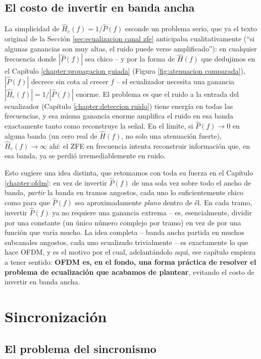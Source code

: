 \subsection*{El costo de invertir en banda ancha}

La simplicidad de $\hat H_e(f)=1/\hat P(f)$ esconde un problema serio, que ya el texto original de la Sección \ref{sec:ecualizacion canal zfe} anticipaba cualitativamente (``si algunas ganancias son muy altas, el ruido puede verse amplificado''): en cualquier frecuencia donde $|\hat P(f)|$ sea chico -- y por la forma de $\hat H(f)$ que dedujimos en el Capítulo \ref{chapter:propagacion guiada} (Figura \ref{fig:atenuacion comparada}), $|\hat P(f)|$ decrece sin cota al crecer $f$ -- el ecualizador necesita una ganancia $|\hat H_e(f)|=1/|\hat P(f)|$ enorme. El problema es que el ruido a la entrada del ecualizador (Capítulo \ref{chapter:deteccion ruido}) tiene energía en todas las frecuencias, y esa misma ganancia enorme amplifica el ruido en esa banda exactamente tanto como reconstruye la señal. En el límite, si $\hat P(f)\to 0$ en alguna banda (un cero real de $\hat H(f)$, no solo una atenuación fuerte), $\hat H_e(f)\to\infty$ ahí: el ZFE en frecuencia intenta reconstruir información que, en esa banda, ya se perdió irremediablemente en ruido.

Esto sugiere una idea distinta, que retomamos con toda su fuerza en el Capítulo \ref{chapter:ofdm}: en vez de invertir $\hat P(f)$ de una sola vez sobre todo el ancho de banda, \emph{partir} la banda en tramos angostos, cada uno lo suficientemente chico como para que $\hat P(f)$ sea aproximadamente \emph{plano} dentro de él. En cada tramo, invertir $\hat P(f)$ ya no requiere una ganancia extrema -- es, esencialmente, dividir por una constante (un único número complejo por tramo) en vez de por una función que varía mucho. La idea completa -- banda ancha partida en muchos subcanales angostos, cada uno ecualizado trivialmente -- es exactamente lo que hace OFDM, y es el motivo por el cual, adelantándolo aquí, ese capítulo empieza a tener sentido: \textbf{OFDM es, en el fondo, una forma práctica de resolver el problema de ecualización que acabamos de plantear}, evitando el costo de invertir en banda ancha.

\section{Sincronización}\label{sec:sincronizacion}

\subsection*{El problema del sincronismo}

